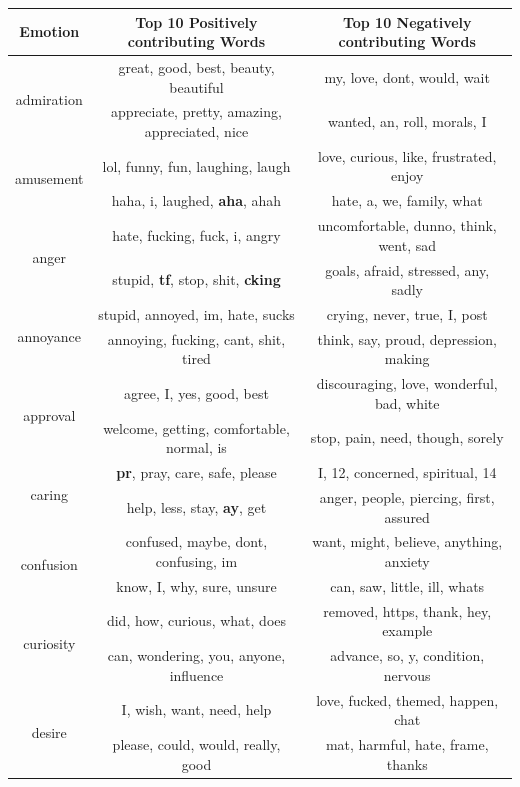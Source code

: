 \documentclass[conference,compsoc]{IEEEtran}
\begin{document}
\begin{table}[ht]
\centering
\begin{tabular}{|c|c|c|}
\hline
\textbf{Emotion} & \textbf{Top 10 Positively contributing Words} & \textbf{Top 10 Negatively contributing Words} \\
\hline
\multirow{2}{*}{admiration} & great, good, best, beauty, beautiful & my, love, dont, would, wait \\
& appreciate, pretty, amazing, appreciated, nice & wanted, an, roll, morals, I \\
\hline
\multirow{2}{*}{amusement} & lol, funny, fun, laughing, laugh & love, curious, like, frustrated, enjoy \\
& haha, i, laughed, \textbf{aha}, ahah & hate, a, we, family, what \\
\hline
\multirow{2}{*}{anger} & hate, fucking, fuck, i, angry & uncomfortable, dunno, think, went, sad \\
& stupid, \textbf{tf}, stop, shit, \textbf{cking} & goals, afraid, stressed, any, sadly \\
\hline
\multirow{2}{*}{annoyance} & stupid, annoyed, im, hate, sucks   & crying, never, true, I, post \\
& annoying, fucking, cant, shit, tired & think, say, proud, depression, making \\
\hline
\multirow{2}{*}{approval} & agree, I, yes, good, best & discouraging, love, wonderful, bad, white \\
& welcome, getting, comfortable, normal, is & stop, pain, need, though, sorely \\
\hline
\multirow{2}{*}{caring} & \textbf{pr}, pray, care, safe, please & I, 12, concerned, spiritual, 14 \\
& help, less, stay, \textbf{ay}, get & anger, people, piercing, first, assured \\
\hline
\multirow{2}{*}{confusion} & confused, maybe, dont, confusing, im & want, might, believe, anything, anxiety \\
& know, I, why, sure, unsure & can, saw, little, ill, whats \\
\hline
\multirow{2}{*}{curiosity} & did, how, curious, what, does & removed, https, thank, hey, example \\
& can, wondering, you, anyone, influence & advance, so, y, condition, nervous \\
\hline
\multirow{2}{*}{desire} & I, wish, want, need, help & love, fucked, themed, happen, chat \\
& please, could, would, really, good & mat, harmful, hate, frame, thanks \\

\end{tabular}
\end{table}
\end{document}
